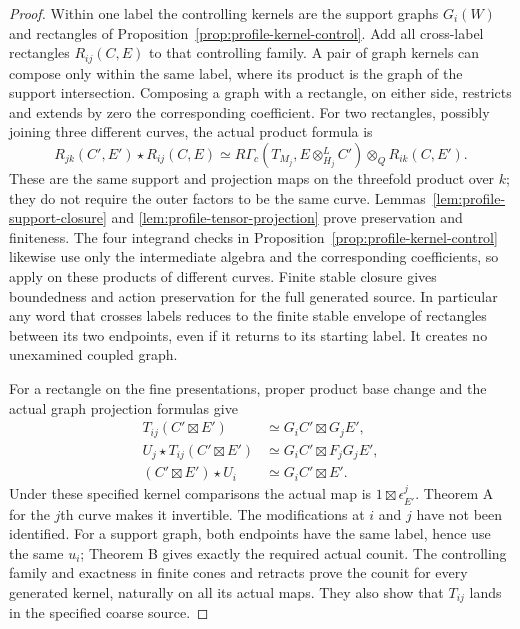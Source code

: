 \documentclass[11pt]{article}
\theoremstyle{definition}
\theoremstyle{remark}
\begin{document}
\begin{proof}
Within one label the controlling kernels are the support graphs
$G_i(W)$ and rectangles of Proposition~\ref{prop:profile-kernel-control}.
Add all cross-label rectangles $R_{ij}(C,E)$ to that controlling
family. A pair of graph kernels can compose only within the same
label, where its product is the graph of the support intersection.
Composing a graph with a rectangle, on either side, restricts and
extends by zero the corresponding coefficient. For two rectangles,
possibly joining three different curves, the actual product formula is
\[
 R_{jk}(C',E')\star R_{ij}(C,E)
 \simeq R\Gamma_c(T_{M_j},E\otimes^L_{H_j}C')
                          \otimes_Q R_{ik}(C,E').
\]
These are the same support and projection maps on the threefold
product over $k$; they do not require the outer factors to be the
same curve. Lemmas~\ref{lem:profile-support-closure} and
\ref{lem:profile-tensor-projection} prove preservation and finiteness.
The four integrand checks in
Proposition~\ref{prop:profile-kernel-control} likewise use only the
intermediate algebra and the corresponding coefficients, so apply
on these products of different curves. Finite stable closure gives
boundedness and action preservation for the full generated source.
In particular any word that crosses labels reduces to the finite
stable envelope of rectangles between its two endpoints, even if it
returns to its starting label. It creates no unexamined coupled graph.

For a rectangle on the fine presentations, proper product base
change and the actual graph projection formulas give
\[
 \begin{aligned}
 T_{ij}(C'\boxtimes E')&\simeq G_iC'\boxtimes G_jE',\\
 U_j\star T_{ij}(C'\boxtimes E')
   &\simeq G_iC'\boxtimes F_jG_jE',\\
 (C'\boxtimes E')\star U_i&\simeq G_iC'\boxtimes E'.
 \end{aligned}
\]
Under these specified kernel comparisons the actual map is
$1\boxtimes\epsilon^j_{E'}$. Theorem A for the $j$th curve makes
it invertible. The modifications at $i$ and $j$ have not been
identified. For a support graph, both endpoints have the same label,
hence use the same $u_i$; Theorem B gives exactly the required actual
counit. The controlling family and exactness in finite cones and
retracts prove the counit for every generated kernel, naturally on
all its actual maps. They also show that $T_{ij}$ lands in the
specified coarse source.


\end{proof}
\end{document}
